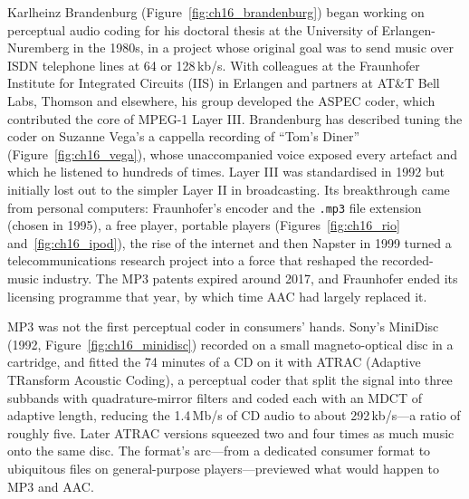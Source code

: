 \begin{history}
Karlheinz Brandenburg (Figure~\ref{fig:ch16_brandenburg}) began working on perceptual audio coding for his doctoral thesis at the
University of Erlangen-Nuremberg in the 1980s, in a project whose original goal was to send music over
ISDN telephone lines at 64 or 128\,kb/s. With colleagues at the Fraunhofer Institute for Integrated
Circuits (IIS) in Erlangen and partners at AT\&T Bell Labs, Thomson and elsewhere, his group developed
the ASPEC coder, which contributed the core of MPEG-1 Layer III. Brandenburg has described tuning the
coder on Suzanne Vega's a cappella recording of ``Tom's Diner'' (Figure~\ref{fig:ch16_vega}), whose unaccompanied voice exposed every
artefact and which he listened to hundreds of times. Layer III was standardised in 1992 but initially
lost out to the simpler Layer II in broadcasting. Its breakthrough came from personal computers:
Fraunhofer's encoder and the \texttt{.mp3} file extension (chosen in 1995), a free player, portable players (Figures~\ref{fig:ch16_rio} and~\ref{fig:ch16_ipod}), the rise of
the internet and then Napster in 1999 turned a telecommunications research project into a force that
reshaped the recorded-music industry. The MP3 patents expired around 2017, and Fraunhofer ended its
licensing programme that year, by which time AAC had largely replaced it.
\end{history}


\begin{inpractice}
MP3 was not the first perceptual coder in consumers' hands. Sony's MiniDisc (1992, Figure~\ref{fig:ch16_minidisc}) recorded on a
small magneto-optical disc in a cartridge, and fitted the 74 minutes of a CD on it with ATRAC
(Adaptive TRansform Acoustic Coding), a perceptual coder that split the signal into three subbands
with quadrature-mirror filters and coded each with an MDCT of adaptive length, reducing the
1.4\,Mb/s of CD audio to about 292\,kb/s---a ratio of roughly five. Later ATRAC versions squeezed two
and four times as much music onto the same disc. The format's arc---from a dedicated consumer
format to ubiquitous files on general-purpose players---previewed what would happen to MP3 and AAC.
\end{inpractice}

